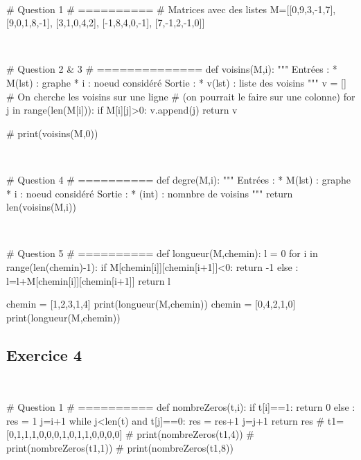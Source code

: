 \documentclass[10pt,fleqn]{article} %
\begin{document}
\begin{multicols}{2}
\begin{corrige}
$\quad$
\begin{python}
# Question 1
# ==========
# Matrices avec des listes
M=[[0,9,3,-1,7],
      [9,0,1,8,-1],
      [3,1,0,4,2],
      [-1,8,4,0,-1],
      [7,-1,2,-1,0]]
\end{python}
\end{corrige}
\newpage

\begin{corrige}
$\quad$
\begin{python}
# Question 2 & 3
# ==============
def voisins(M,i):
    """
    Entrées : 
      * M(lst) : graphe
      * i : noeud considéré
    Sortie :
      * v(lst) : liste des voisins
    """
    v = []
    # On cherche les voisins sur une ligne 
    # (on pourrait le faire sur une colonne)
    for j in range(len(M[i])):
        if M[i][j]>0:
            v.append(j)
    return v
    
# print(voisins(M,0))
\end{python}
\end{corrige}

\begin{corrige}
$\quad$
\begin{python}
# Question 4
# ==========
def degre(M,i):
    """
    Entrées : 
      * M(lst) : graphe
      * i : noeud considéré
    Sortie :
      * (int) : nomnbre de voisins
    """
    return len(voisins(M,i))
\end{python}
\end{corrige}

\begin{corrige}
$\quad$
\begin{python}
# Question 5
# ==========
def longueur(M,chemin):
    l = 0
    for i in range(len(chemin)-1):
        if M[chemin[i]][chemin[i+1]]<0:
            return -1
        else :
            l=l+M[chemin[i]][chemin[i+1]]
    return l
    
chemin = [1,2,3,1,4]
print(longueur(M,chemin))        
chemin = [0,4,2,1,0]
print(longueur(M,chemin))
\end{python}
\end{corrige}

\subsection*{Exercice 4}
\begin{corrige}
$\quad$
\begin{python}
# Question 1 
# ==========
def nombreZeros(t,i):
    if t[i]==1:
        return 0
    else : 
        res = 1
        j=i+1
        while j<len(t) and t[j]==0:
            res = res+1
            j=j+1
    return res
# t1=[0,1,1,1,0,0,0,1,0,1,1,0,0,0,0]
# print(nombreZeros(t1,4))
# print(nombreZeros(t1,1))
# print(nombreZeros(t1,8))
\end{python}
\end{corrige}


\end{multicols}
\end{document}
